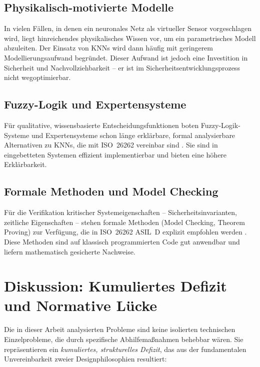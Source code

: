 ﻿\documentclass[12pt,a4paper]{article}
\begin{document}
\subsection{Physikalisch-motivierte Modelle}
\label{subsec:alt_phys}

In vielen F\"allen, in denen ein neuronales Netz als virtueller Sensor vorgeschlagen
wird, liegt hinreichendes physikalisches Wissen vor, um ein parametrisches Modell
abzuleiten. Der Einsatz von KNNs wird dann h\"aufig mit geringerem Modellierungsaufwand
begr\"undet. Dieser Aufwand ist jedoch eine Investition in Sicherheit und
Nachvollziehbarkeit -- er ist im Sicherheitsentwicklungsprozess nicht wegoptimierbar.

\subsection{Fuzzy-Logik und Expertensysteme}
\label{subsec:alt_fuzzy}

F\"ur qualitative, wissensbasierte Entscheidungsfunktionen boten Fuzzy-Logik-Systeme
und Expertensysteme schon l\"ange erkl\"arbare, formal analysierbare Alternativen
zu KNNs, die mit ISO~26262 vereinbar sind \cite{Kurd2003}. Sie sind in
eingebetteten Systemen effizient implementierbar und bieten eine h\"ohere
Erkl\"arbarkeit.

\subsection{Formale Methoden und Model Checking}
\label{subsec:alt_formal}

F\"ur die Verifikation kritischer Systemeigenschaften -- Sicherheitsinvarianten,
zeitliche Eigenschaften -- stehen formale Methoden (Model Checking, Theorem
Proving) zur Verf\"ugung, die in ISO~26262 ASIL~D explizit empfohlen werden
\cite{iso26262_6}. Diese Methoden sind auf klassisch programmierten Code gut
anwendbar und liefern mathematisch gesicherte Nachweise.

\section{Diskussion: Kumuliertes Defizit und Normative L\"ucke}
\label{sec:diskussion}

Die in dieser Arbeit analysierten Probleme sind keine isolierten technischen
Einzelprobleme, die durch spezifische Abhilfe\-ma\ss{}nahmen behebbar w\"aren.
Sie repr\"asentieren ein \emph{kumuliertes, strukturelles Defizit}, das aus der
fundamentalen Unvereinbarkeit zweier Designphilosophien resultiert:
\end{document}
